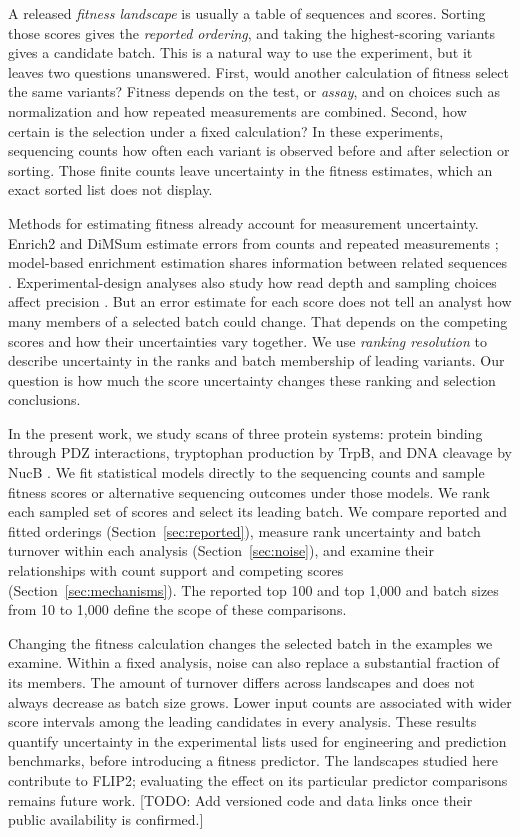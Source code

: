\documentclass[11pt]{article}
\newcommand{\note}[1]{\textcolor{boxrule}{\small[#1]}}
\begin{document}
A released \emph{fitness landscape} is usually a table of sequences and
scores. Sorting those scores gives the \emph{reported ordering}, and taking
the highest-scoring variants gives a candidate batch. This is a natural
way to use the experiment, but it leaves two questions unanswered. First,
would another calculation of fitness select the same variants? Fitness
depends on the test, or \emph{assay}, and on choices such as normalization
and how repeated measurements are combined. Second, how certain is the
selection under a fixed calculation? In these experiments, sequencing
counts how often each variant is observed before and after selection or
sorting. Those finite counts leave uncertainty in the fitness estimates,
which an exact sorted list does not display.

Methods for estimating fitness already account for measurement uncertainty.
Enrich2 and DiMSum estimate errors from counts and repeated measurements
\citep{rubin2017,faure2020}; model-based enrichment estimation shares
information between related sequences \citep{busia2023}. Experimental-design
analyses also study how read depth and sampling choices affect precision
\citep{matuszewski2016}. But an error estimate for each score does not
tell an analyst how many members of a selected batch could change. That
depends on the competing scores and how their uncertainties vary together.
We use \emph{ranking resolution} to describe uncertainty in the ranks and
batch membership of leading variants. Our question is how much the score
uncertainty changes these ranking and selection conclusions.

In the present work, we study scans of three protein systems: protein
binding through PDZ interactions, tryptophan
production by TrpB, and DNA cleavage by NucB
\citep{zarin2024,johnston2024,thomas2025}. We fit statistical models directly
to the sequencing counts and sample fitness scores or alternative sequencing
outcomes under those models. We rank each sampled set of scores and select
its leading batch. We compare reported and fitted orderings
(Section~\ref{sec:reported}), measure rank uncertainty and batch turnover
within each analysis (Section~\ref{sec:noise}), and examine their relationships
with count support and competing scores (Section~\ref{sec:mechanisms}).
The reported top 100 and top 1,000 and batch sizes from 10 to 1,000 define
the scope of these comparisons.

Changing the fitness calculation changes the selected batch in the examples
we examine. Within a fixed analysis, noise can also replace a substantial
fraction of its members. The amount of turnover differs across landscapes
and does not always decrease as batch size grows. Lower input counts are
associated with wider score intervals among the leading candidates in every
analysis.
These results quantify uncertainty in the experimental lists used for
engineering and prediction benchmarks, before introducing a fitness predictor.
The landscapes studied here contribute to FLIP2; evaluating the effect on
its particular predictor comparisons remains future work.
\note{TODO: Add versioned code and data links once their public availability
is confirmed.}
\end{document}
